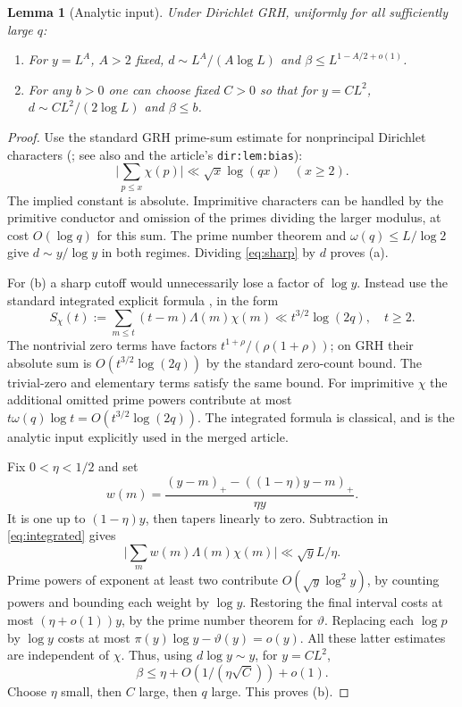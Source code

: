 \documentclass[11pt]{article}
\newtheorem{lemma}[theorem]{Lemma}
\theoremstyle{remark}\newtheorem{remark}[theorem]{Remark}
\newcommand{\abs}[1]{\lvert#1\rvert}
\begin{document}
\begin{lemma}[Analytic input]\label{lem:bias}
Under Dirichlet GRH, uniformly for all sufficiently large $q$:
\begin{enumerate}[label=(\alph*)]
\item For $y=L^A$, $A>2$ fixed, $d\sim L^A/(A\log L)$ and $\beta\le L^{1-A/2+o(1)}$.
\item For any $b>0$ one can choose fixed $C>0$ so that for $y=CL^2$, $d\sim CL^2/(2\log L)$ and $\beta\le b$.
\end{enumerate}
\end{lemma}
\begin{proof}
Use the standard GRH prime-sum estimate for nonprincipal Dirichlet characters (\cite[Ch.~13, Theorem 13.7 and (13.21)]{mv}; see also \cite{jmv} and the article's \texttt{dir:lem:bias}):
\begin{equation}\label{eq:sharp}
 \abs{\sum_{p\le x}\chi(p)}\ll \sqrt{x}\log(qx)\quad(x\ge2).
\end{equation}
The implied constant is absolute. Imprimitive characters can be handled by the primitive conductor and omission of the primes dividing the larger modulus, at cost $O(\log q)$ for this sum. The prime number theorem and $\omega(q)\le L/\log 2$ give $d\sim y/\log y$ in both regimes. Dividing \eqref{eq:sharp} by $d$ proves (a).

For (b) a sharp cutoff would unnecessarily lose a factor of $\log y$. Instead use the standard integrated explicit formula \cite[Ch.~13, (13.28)]{mv}, in the form
\begin{equation}\label{eq:integrated}
 S_\chi(t):=\sum_{m\le t}(t-m)\Lambda(m)\chi(m)\ll t^{3/2}\log(2q),\quad t\ge 2.
\end{equation}
The nontrivial zero terms have factors $t^{1+\rho}/(\rho(1+\rho))$; on GRH their absolute sum is $O(t^{3/2}\log(2q))$ by the standard zero-count bound. The trivial-zero and elementary terms satisfy the same bound. For imprimitive $\chi$ the additional omitted prime powers contribute at most $t\omega(q)\log t=O(t^{3/2}\log(2q))$. The integrated formula is classical, and is the analytic input explicitly used in the merged article.

Fix $0<\eta<1/2$ and set
\[
 w(m)=\frac{(y-m)_+-((1-\eta)y-m)_+}{\eta y}.
\]
It is one up to $(1-\eta)y$, then tapers linearly to zero. Subtraction in \eqref{eq:integrated} gives\[\abs{\sum_mw(m)\Lambda(m)\chi(m)}\ll\sqrt y L/\eta.\] Prime powers of exponent at least two contribute $O(\sqrt y\log^2y)$, by counting powers and bounding each weight by $\log y$. Restoring the final interval costs at most $(\eta+o(1))y$, by the prime number theorem for $\vartheta$. Replacing each $\log p$ by $\log y$ costs at most $\pi(y)\log y-\vartheta(y)=o(y)$. All these latter estimates are independent of $\chi$. Thus, using $d\log y\sim y$, for $y=CL^2$,
\[
 \beta\le \eta+O(1/(\eta\sqrt C))+o(1).
\]
Choose $\eta$ small, then $C$ large, then $q$ large. This proves (b).
\end{proof}
\end{document}
